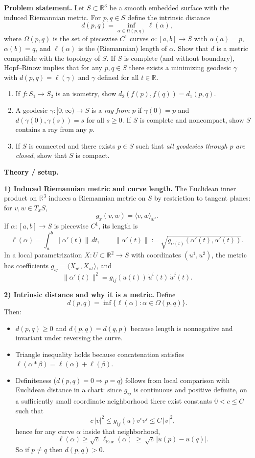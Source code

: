 \documentclass[12pt,a4paper]{article}
\theoremstyle{plain}
\theoremstyle{definition}      %
\begin{document}
	\textbf{Problem statement.}
	Let $S\subset\mathbb R^3$ be a smooth embedded surface with the induced Riemannian metric.
	For $p,q\in S$ define the intrinsic distance
	\[
	d(p,q)=\inf_{\alpha\in\Omega(p,q)}\ell(\alpha),
	\]
	where $\Omega(p,q)$ is the set of piecewise $C^1$ curves $\alpha:[a,b]\to S$ with $\alpha(a)=p$, $\alpha(b)=q$,
	and $\ell(\alpha)$ is the (Riemannian) length of $\alpha$.
	Show that $d$ is a metric compatible with the topology of $S$.
	If $S$ is complete (and without boundary), Hopf--Rinow implies that for any $p,q\in S$ there exists a minimizing geodesic
	$\gamma$ with $d(p,q)=\ell(\gamma)$ and $\gamma$ defined for all $t\in\mathbb R$.
	
	\begin{enumerate}
		\item[(i)] If $f:S_1\to S_2$ is an isometry, show $d_2(f(p),f(q))=d_1(p,q)$.
		\item[(ii)] A geodesic $\gamma:[0,\infty)\to S$ is a \emph{ray from $p$} if $\gamma(0)=p$ and
		$d(\gamma(0),\gamma(s))=s$ for all $s\ge 0$. If $S$ is complete and noncompact, show $S$ contains a ray from any $p$.
		\item[(iii)] If $S$ is connected and there exists $p\in S$ such that \emph{all geodesics through $p$ are closed},
		show that $S$ is compact.
	\end{enumerate}
	
	\medskip
	\textbf{Theory / setup.}
	
	\smallskip
	\textbf{1) Induced Riemannian metric and curve length.}
	The Euclidean inner product on $\mathbb R^3$ induces a Riemannian metric on $S$ by restriction to tangent planes:
	for $v,w\in T_xS$,
	\[
	g_x(v,w)=\langle v,w\rangle_{\mathbb R^3}.
	\]
	If $\alpha:[a,b]\to S$ is piecewise $C^1$, its length is
	\[
	\ell(\alpha)=\int_a^b \|\alpha'(t)\|\,dt,
	\qquad \|\alpha'(t)\|:=\sqrt{g_{\alpha(t)}(\alpha'(t),\alpha'(t))}.
	\]
	In a local parametrization $X:U\subset\mathbb R^2\to S$ with coordinates $(u^1,u^2)$,
	the metric has coefficients $g_{ij}=\langle X_{u^i},X_{u^j}\rangle$, and
	\[
	\|\alpha'(t)\|^2=g_{ij}(u(t))\,\dot u^i(t)\,\dot u^j(t).
	\]
	
	\smallskip
	\textbf{2) Intrinsic distance and why it is a metric.}
	Define
	\[
	d(p,q)=\inf\{\ell(\alpha):\alpha\in\Omega(p,q)\}.
	\]
	Then:
	\begin{itemize}
		\item $d(p,q)\ge 0$ and $d(p,q)=d(q,p)$ because length is nonnegative and invariant under reversing the curve.
		\item Triangle inequality holds because concatenation satisfies $\ell(\alpha*\beta)=\ell(\alpha)+\ell(\beta)$.
		\item Definiteness ($d(p,q)=0\Rightarrow p=q$) follows from local comparison with Euclidean distance in a chart:
		since $g_{ij}$ is continuous and positive definite, on a sufficiently small coordinate neighborhood there exist constants
		$0<c\le C$ such that
		\[
		c\,|v|^2 \le g_{ij}(u)v^iv^j \le C\,|v|^2,
		\]
		hence for any curve $\alpha$ inside that neighborhood,
		\[
		\ell(\alpha)\ge \sqrt{c}\,\ell_{\text{Euc}}(\alpha)\ \ge\ \sqrt{c}\,|u(p)-u(q)|.
		\]
		So if $p\neq q$ then $d(p,q)>0$.
	\end{itemize}
	
\end{document}
